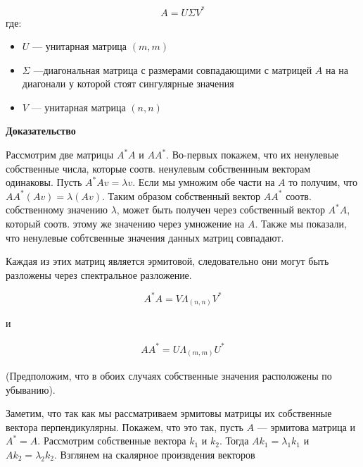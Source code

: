 \documentclass{article}
\begin{document}
    \begin{equation}
        A = U \Sigma V^{*}
    \end{equation}
    где: 

    \begin{itemize}
        \item $U$ --- унитарная матрица $(m, m)$
        \item $\Sigma$ ---диагональная матрица с размерами совпадающими с матрицей $A$ на 
        на диагонали у которой стоят сингулярные значения 
        \item $V$ --- унитарная матрица $(n, n)$
    \end{itemize}

    \quad 

    \textbf{Доказательство}

    \quad 

    Рассмотрим две матрицы $A^{*} A$ и $A A^{*}$. Во-первых покажем, что их ненулевые собственные числа, которые соотв. ненулевым собственнным векторам одинаковы.
    Пусть $A^{*}Av = \lambda v$. Если мы умножим обе части на $A$ то получим, что $AA^{*}(Av) = \lambda (Av)$.
    Таким образом собственный вектор $AA^{*}$ соотв. собственному значению $\lambda$, может быть получен
    через собственный вектор $A^{*}A$, который соотв. этому же значению через умножение на $A$. Также мы показали, что
    ненулевые собтсвенные значения данных матриц совпадают.

    \quad 
    
    Каждая из этих матриц является эрмитовой, следовательно 
    они могут быть разложены через спектральное разложение.

    \begin{equation}
        A^{*} A = V \Lambda_{(n, n)} V^{*} 
    \end{equation}

    и 

    \begin{eqnarray}
        A A^{*} = U \Lambda_{(m, m)} U^{*}
    \end{eqnarray}

    (Предположим, что в обоих случаях собственные значения расположены по убыванию).

    \quad

    Заметим, что так как мы рассматриваем эрмитовы матрицы их собственные вектора перпендикулярны. Покажем, что это так, пусть 
    $A$ --- эрмитова матрица и $A^{*} = A$. Рассмотрим собственные вектора $k_{1}$ и $k_{2}$. Тогда 
    $A k_{1} = \lambda_{1} k_{1}$ и $A k_{2} = \lambda_{2} k_{2}$. Взглянем на скалярное произвдения
    векторов
\end{document}
